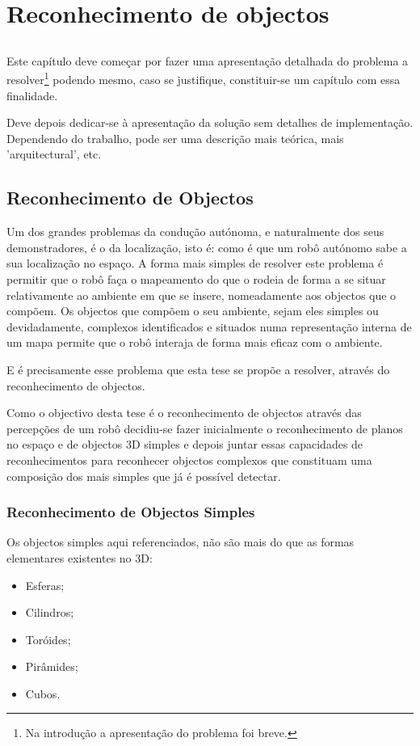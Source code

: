 \chapter{Reconhecimento de objectos}\label{chap:chap3}

\section*{}

Este capítulo deve começar por fazer uma apresentação detalhada do
problema a resolver\footnote{Na introdução a apresentação do
  problema foi breve.} podendo mesmo, caso se justifique,
constituir-se um capítulo com essa finalidade.

Deve depois dedicar-se à apresentação da solução sem detalhes de
implementação. 
Dependendo do trabalho, pode ser uma descrição mais teórica, mais
'arquitectural', etc.

\section{Reconhecimento de Objectos}

Um dos grandes problemas da condução autónoma, e naturalmente dos seus demonstradores, é o
da localização, isto é: como é que um robô autónomo sabe a sua localização no espaço. A 
forma mais simples de resolver este problema é permitir que o robô faça o mapeamento do que
o rodeia de forma a se situar relativamente ao ambiente em que se insere, nomeadamente aos 
objectos que o compõem.
Os objectos que compõem o seu ambiente, sejam eles simples ou devidadamente, complexos
identificados e situados numa representação interna de um mapa permite que o robô interaja de 
forma mais eficaz com o ambiente.

E é precisamente esse problema que esta tese se propõe a resolver, através do reconhecimento de
objectos.

Como o objectivo desta tese é o reconhecimento de objectos através das percepções de um 
robô decidiu-se fazer inicialmente o reconhecimento de planos no espaço e de objectos 3D
simples e depois juntar essas capacidades de reconhecimentos para reconhecer objectos 
complexos que constituam uma composição dos mais simples que já é possível detectar.

\subsection{Reconhecimento de Objectos Simples}
Os objectos simples aqui referenciados, não são mais do que as formas elementares existentes
no 3D:
\begin{itemize}
\item Esferas;
\item Cilindros;
\item Toróides;
\item Pirâmides;
\item Cubos.
\end{itemize}

